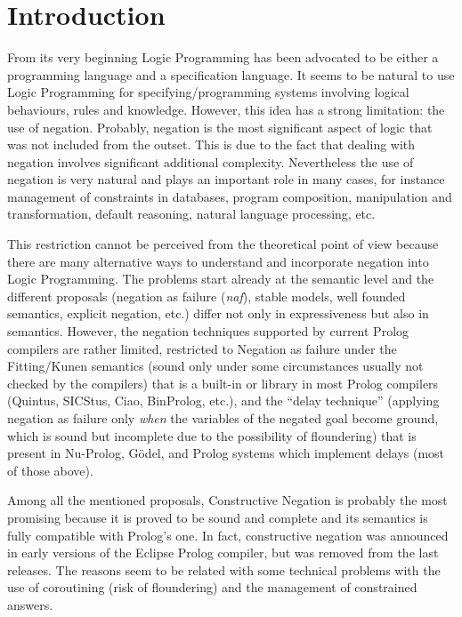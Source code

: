 \documentclass{llncs}
\newcommand{\naf}{{\em naf}}\newcommand{\viejo}[1]{}
\begin{document}

\section{Introduction}
\label{introduction}
From its very beginning Logic Programming has been advocated to be
either a programming language and a specification language.  It seems
to be natural to use Logic Programming for specifying/programming
systems involving logical behaviours, rules and knowledge. However,
this idea has a strong limitation: the use of negation.  Probably,
negation is the most significant aspect of logic that was not included
from the outset. This is due to the fact that dealing with negation
involves significant additional complexity.  Nevertheless the use of
negation is very natural and plays an important role in many cases,
for instance management of constraints in databases, program
composition, manipulation and transformation, default reasoning, natural
language processing, etc.

This restriction cannot be perceived from the theoretical point of
view because there are many alternative ways to understand and
incorporate negation into Logic Programming. The problems
start already at the semantic level and the different proposals
(negation as failure (\naf), stable models, well founded semantics,
explicit negation, etc.)  differ not only in expressiveness but also
in semantics.  However, the negation techniques supported by current
Prolog compilers are rather limited, restricted to Negation as failure
under the Fitting/Kunen semantics \cite{Kunen} (sound only under some
circumstances usually not checked by the compilers) 
that is a built-in or library in most Prolog compilers
(Quintus, SICStus, Ciao, BinProlog, etc.), and the ``delay technique''
(applying negation as failure only \emph{when} the variables of the
negated goal become ground, which is sound but incomplete due to the
possibility of floundering) that is present in Nu-Prolog, G\"odel, and
Prolog systems which implement delays (most of those above).

Among all the mentioned proposals, Constructive Negation
\cite{Chan1,Chan2} is probably the most promising because it is proved
to be sound and complete and its semantics is fully compatible with
Prolog's one. In fact, constructive negation was announced in early
versions of the Eclipse Prolog compiler, but was removed from the last
releases.  The reasons seem to be related with some technical problems
with the use of coroutining (risk of floundering) and the management
of constrained answers.
\end{document}
